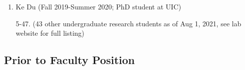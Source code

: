 \documentclass[10pt,letterpaper]{article}
\renewenvironment{itemize}{
  \begin{list}{}{
    \setlength{\leftmargin}{1.25em}
    \setlength{\itemsep}{0.25em}
    \setlength{\parskip}{0pt}
    \setlength{\parsep}{0.2em}
  }
}{
  \end{list}
}
\begin{document}
\begin{itemize}
\begin{enumerate}
    \item Ke Du (Fall 2019-Summer 2020; PhD student at UIC)
    \item[5-47.] (43 other undergraduate research students as of Aug 1, 2021, see lab website for full listing) 
  \end{enumerate}
\end{itemize}

\subsection*{Prior to Faculty Position}
\end{document}
